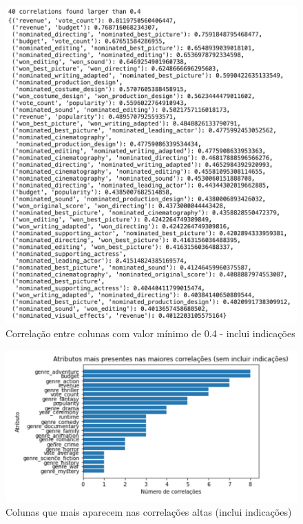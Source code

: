             \begin{figure}[htb]
            	\caption{\label{corrs0.4}Correlação entre colunas com valor mínimo de 0.4 - inclui indicações}
            	\begin{center}
            		\includegraphics[scale=0.7]{corrs0.4.png}
            	\end{center}
            \end{figure}
            
            \begin{figure}[htb]
            	\caption{\label{colunas_influentes_2}Colunas que mais aparecem nas correlações altas (inclui indicações)}
            	\begin{center}
            		\includegraphics[scale=0.7]{colunas_influentes_2.png}
            	\end{center}
            \end{figure}

